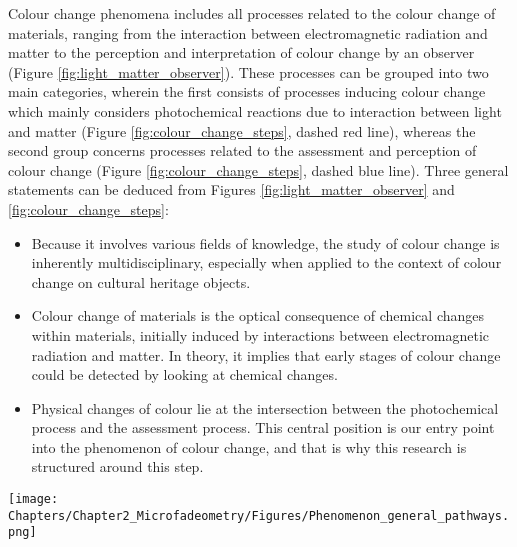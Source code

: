 Colour change phenomena includes all processes related to the colour change of materials, ranging from the interaction between electromagnetic radiation and matter to the perception and interpretation of colour change by an observer (Figure \ref{fig:light_matter_observer}). These processes can be grouped into two main categories, wherein the first consists of processes inducing colour change which mainly considers photochemical reactions due to interaction between light and matter (Figure \ref{fig:colour_change_steps}, dashed red line), whereas the second group concerns processes related to the assessment and perception of colour change (Figure \ref{fig:colour_change_steps}, dashed blue line). Three general statements can be deduced from Figures \ref{fig:light_matter_observer} and \ref{fig:colour_change_steps}:

\begin{itemize}
    \item Because it involves various fields of knowledge, the study of colour change is inherently multidisciplinary, especially when applied to the context of colour change on cultural heritage objects.
    \item Colour change of materials is the optical consequence of chemical changes within materials, initially induced by interactions between electromagnetic radiation and matter. In theory, it implies that early stages of colour change could be detected by looking at chemical changes.
    \item Physical changes of colour lie at the intersection between the photochemical process and the assessment process. This central position is our entry point into the phenomenon of colour change, and that is why this research is structured around this step.
\end{itemize}

\begin{figure*} %
\centering
\texttt{[image: Chapters/Chapter2\_Microfadeometry/Figures/Phenomenon\_general\_pathways.png]}
\caption[\hspace{0.3cm}Overall steps of colour change phenomenon]{Overall steps of colour change phenomenon.}
\label{fig:colour_change_steps}
\end{figure*}





